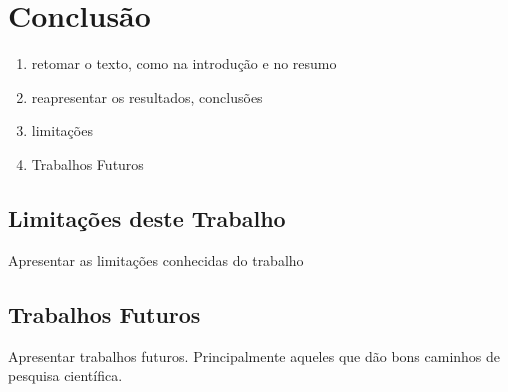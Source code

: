 \section{Conclusão}\label{sec:conclusao}

\begin{enumerate}
\item retomar o texto, como na introdução e no resumo
\item reapresentar os resultados, conclusões
\item limitações
\item Trabalhos Futuros
\end{enumerate}

\subsection{Limitações deste Trabalho}
Apresentar as limitações conhecidas do trabalho
\subsection{Trabalhos Futuros}
Apresentar trabalhos futuros. Principalmente aqueles que dão bons caminhos de pesquisa científica.